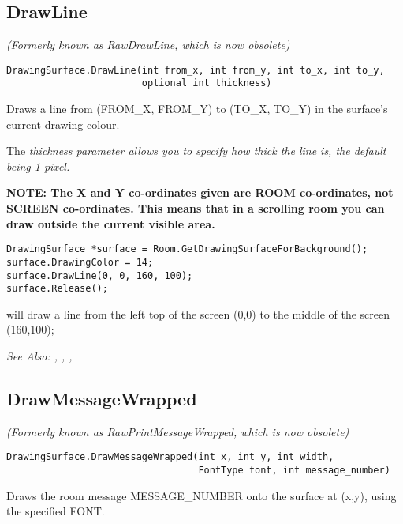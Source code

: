 \subsection{DrawLine}\label{DrawingSurface.DrawLine}%

\it{(Formerly known as RawDrawLine, which is now obsolete)}

\begin{verbatim}
DrawingSurface.DrawLine(int from_x, int from_y, int to_x, int to_y,
                        optional int thickness)
\end{verbatim}
Draws a line from (FROM_X, FROM_Y) to (TO_X, TO_Y) in the surface's current drawing colour.

The \it{thickness} parameter allows you to specify how thick the line is, the default being 1 pixel.

\bf{NOTE:} The X and Y co-ordinates given are ROOM co-ordinates, not SCREEN co-ordinates.
This means that in a scrolling room you can draw outside the current visible area.

\begin{verbatim}
DrawingSurface *surface = Room.GetDrawingSurfaceForBackground();
surface.DrawingColor = 14;
surface.DrawLine(0, 0, 160, 100);
surface.Release();
\end{verbatim}
will draw a line from the left top of the screen (0,0) to the middle of the screen (160,100);

\it{See Also:} ,
,
,


\subsection{DrawMessageWrapped}\label{DrawingSurface.DrawMessageWrapped}%

\it{(Formerly known as RawPrintMessageWrapped, which is now obsolete)}

\begin{verbatim}
DrawingSurface.DrawMessageWrapped(int x, int y, int width,
                                  FontType font, int message_number)
\end{verbatim}
Draws the room message MESSAGE_NUMBER onto the surface at (x,y), using the
specified FONT.

